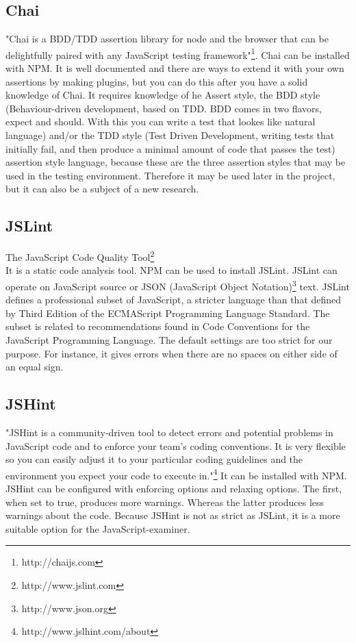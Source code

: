 \documentclass{article}
\begin{document}
\subsection{Chai}
"Chai is a BDD/TDD assertion library for node and the browser that can be delightfully paired with any JavaScript testing framework"\footnote{http://chaijs.com}.
Chai can be installed with NPM.
It is well documented and there are ways to extend it with your own assertions by making plugins,
but you can do this after you have a solid knowledge of Chai.
It requires knowledge of he Assert style, the BDD style (Behaviour-driven development, based on TDD. BDD comes in two flavors, expect and should. With this you can write a test that lookes like natural language) and/or the TDD style (Test Driven Development, writing tests that initially fail, and then produce a minimal amount of code that passes the test) assertion style language, because these are the three assertion styles that may be used in the testing environment.
Therefore it may be used later in the project, but it can also be a subject of a new research.

\subsection{JSLint}
The JavaScript Code Quality Tool\footnote{http://www.jslint.com}\\
It is a static code analysis tool.
NPM can be used to install JSLint.
JSLint can operate on JavaScript source or JSON (JavaScript Object Notation)\footnote {http://www.json.org} text.
JSLint defines a professional subset of JavaScript, a stricter language than that 
defined by Third Edition of the ECMAScript Programming Language Standard.
The subset is related to recommendations found in Code Conventions for the JavaScript Programming Language.
The default settings are too strict for our purpose.
For instance, it gives errors when there are no spaces on either side of an equal sign.

\subsection{JSHint}
"JSHint is a community-driven tool to detect errors and potential problems in JavaScript code and to enforce your team's coding conventions. It is very flexible so you can easily adjust it to your particular coding guidelines and the environment you expect your code to execute in."\footnote{http://www.jslhint.com/about}
It can be installed with NPM.
JSHint can be configured with enforcing options and relaxing options.
The first, when set to true, produces more warnings. Whereas the latter produces less warnings about the code.
Because JSHint is not as strict as JSLint, it is a more suitable option for the JavaScript-examiner.
\end{document}
